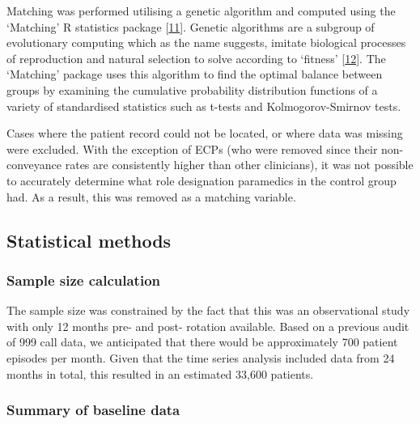 \documentclass[
  a4paper,
  openany]{article}
\begin{document}
Matching was performed utilising a genetic algorithm and computed using the `Matching' R statistics package {[}\protect\hyperlink{ref-sekhon_multivariate_2011}{11}{]}. Genetic algorithms are a subgroup of evolutionary computing which as the name suggests, imitate biological processes of reproduction and natural selection to solve according to `fitness' {[}\protect\hyperlink{ref-mitchell_introduction_1996}{12}{]}. The `Matching' package uses this algorithm to find the optimal balance between groups by examining the cumulative probability distribution functions of a variety of standardised statistics such as t-tests and Kolmogorov-Smirnov tests.

Cases where the patient record could not be located, or where data was missing were excluded. With the exception of ECPs (who were removed since their non-conveyance rates are consistently higher than other clinicians), it was not possible to accurately determine what role designation paramedics in the control group had. As a result, this was removed as a matching variable.

\hypertarget{statistical-methods}{%
\subsection*{Statistical methods}\label{statistical-methods}}

\hypertarget{sample-size-calculation}{%
\subsubsection*{Sample size calculation}\label{sample-size-calculation}}

The sample size was constrained by the fact that this was an observational study with only 12 months pre- and post- rotation available. Based on a previous audit of 999 call data, we anticipated that there would be approximately 700 patient episodes per month. Given that the time series analysis included data from 24 months in total, this resulted in an estimated 33,600 patients.

\hypertarget{summary-of-baseline-data}{%
\subsubsection*{Summary of baseline data}\label{summary-of-baseline-data}}
\end{document}
